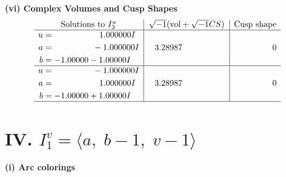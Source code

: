 \documentclass[1p]{elsarticle_modified}
\theoremstyle{definition}
\newcommand{\I}{\sqrt{-1}}
\begin{document}
\newpage\flushleft \textbf{(vi) Complex Volumes and Cusp Shapes}
$$\begin{array}{c|c|c}  
\text{Solutions to }I^u_{3}& \I (\text{vol} + \sqrt{-1}CS) & \text{Cusp shape}\\
 \hline 
\begin{aligned}
u &= \phantom{-0.000000 -}1.000000 I \\
a &= \phantom{-0.000000 } -1.000000 I \\
b &= -1.00000 - 1.00000 I\end{aligned}
 & \phantom{-}3.28987\phantom{ +0.000000I} & \phantom{-0.000000 } 0 \\ \hline\begin{aligned}
u &= \phantom{-0.000000 } -1.000000 I \\
a &= \phantom{-0.000000 -}1.000000 I \\
b &= -1.00000 + 1.00000 I\end{aligned}
 & \phantom{-}3.28987\phantom{ +0.000000I} & \phantom{-0.000000 } 0\\
 \hline 
 \end{array}$$\newpage\newpage\renewcommand{\arraystretch}{1}
\centering \section*{IV. $I^v_{1}= \langle a,\;b-1,\;v-1 \rangle$}
\flushleft \textbf{(i) Arc colorings}\\
\end{document}
